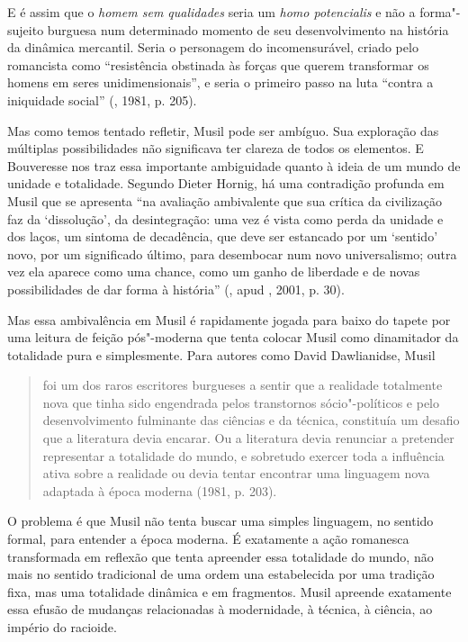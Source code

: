 E é assim que o \emph{homem sem qualidades} seria um \emph{homo
potencialis} e não a forma"-sujeito burguesa num determinado momento de
seu desenvolvimento na história da dinâmica mercantil. Seria o
personagem do incomensurável, criado pelo romancista como ``resistência
obstinada às forças que querem transformar os homens em seres
unidimensionais'', e seria o primeiro passo na luta ``contra a
iniquidade social'' (, 1981, p. 205).

Mas como temos tentado refletir, Musil pode ser ambíguo. Sua exploração
das múltiplas possibilidades não significava ter clareza de todos os
elementos. E Bouveresse nos traz essa importante ambiguidade quanto à
ideia de um mundo de unidade e totalidade. Segundo Dieter Hornig, há uma
contradição profunda em Musil que se apresenta ``na avaliação
ambivalente que sua crítica da civilização faz da `dissolução', da
desintegração: uma vez é vista como perda da unidade e dos laços, um
sintoma de decadência, que deve ser estancado por um `sentido' novo, por
um significado último, para desembocar num novo universalismo; outra vez
ela aparece como uma chance, como um ganho de liberdade e de novas
possibilidades de dar forma à história'' (, apud ,
2001, p. 30).

Mas essa ambivalência em Musil é rapidamente jogada para baixo do tapete
por uma leitura de feição pós"-moderna que tenta colocar Musil como
dinamitador da totalidade pura e simplesmente. Para autores como David
Dawlianidse, Musil

\begin{quote}
foi um dos raros escritores burgueses a sentir que a realidade
totalmente nova que tinha sido engendrada pelos transtornos
sócio"-políticos e pelo desenvolvimento fulminante das ciências e da
técnica, constituía um desafio que a literatura devia encarar. Ou a
literatura devia renunciar a pretender representar a totalidade do
mundo, e sobretudo exercer toda a influência ativa sobre a realidade ou
devia tentar encontrar uma linguagem nova adaptada à época moderna
(1981, p. 203).
\end{quote}

O problema é que Musil não tenta buscar uma simples linguagem, no
sentido formal, para entender a época moderna. É exatamente a ação
romanesca transformada em reflexão que tenta apreender essa totalidade
do mundo, não mais no sentido tradicional de uma ordem una estabelecida
por uma tradição fixa, mas uma totalidade dinâmica e em fragmentos.
Musil apreende exatamente essa efusão de mudanças relacionadas à
modernidade, à técnica, à ciência, ao império do racioide.

